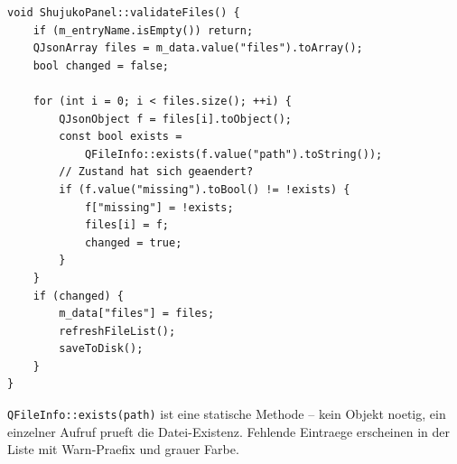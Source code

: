 \begin{lstlisting}[caption={validateFiles: missing-Flag aktualisieren}]
void ShujukoPanel::validateFiles() {
    if (m_entryName.isEmpty()) return;
    QJsonArray files = m_data.value("files").toArray();
    bool changed = false;

    for (int i = 0; i < files.size(); ++i) {
        QJsonObject f = files[i].toObject();
        const bool exists =
            QFileInfo::exists(f.value("path").toString());
        // Zustand hat sich geaendert?
        if (f.value("missing").toBool() != !exists) {
            f["missing"] = !exists;
            files[i] = f;
            changed = true;
        }
    }
    if (changed) {
        m_data["files"] = files;
        refreshFileList();
        saveToDisk();
    }
}
\end{lstlisting}

\verb|QFileInfo::exists(path)| ist eine statische Methode --
kein Objekt noetig, ein einzelner Aufruf prueft die
Datei-Existenz. Fehlende Eintraege erscheinen in der Liste
mit Warn-Praefix und grauer Farbe.

